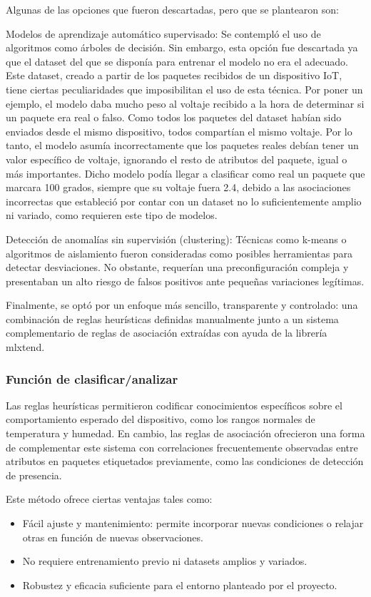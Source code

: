 Algunas de las opciones que fueron descartadas, pero que se plantearon son:

Modelos de aprendizaje automático supervisado: Se contempló el uso de algoritmos como árboles de decisión. Sin embargo, esta opción fue descartada ya que el dataset del que se disponía para entrenar el modelo no era el adecuado. Este dataset, creado a partir de los paquetes recibidos de un dispositivo IoT, tiene ciertas peculiaridades que imposibilitan el uso de esta técnica. Por poner un ejemplo, el modelo daba mucho peso al voltaje recibido a la hora de determinar si un paquete era real o falso. Como todos los paquetes del dataset habían sido enviados desde el mismo dispositivo, todos compartían el mismo voltaje. Por lo tanto, el modelo asumía incorrectamente que los paquetes reales debían tener un valor específico de voltaje, ignorando el resto de atributos del paquete, igual o más importantes. Dicho modelo podía llegar a clasificar como real un paquete que marcara 100 grados, siempre que su voltaje fuera 2.4, debido a las asociaciones incorrectas que estableció por contar con un dataset no lo suficientemente amplio ni variado, como requieren este tipo de modelos.

Detección de anomalías sin supervisión (clustering): Técnicas como k-means o algoritmos de aislamiento fueron consideradas como posibles herramientas para detectar desviaciones. No obstante, requerían una preconfiguración compleja y presentaban un alto riesgo de falsos positivos ante pequeñas variaciones legítimas.

Finalmente, se optó por un enfoque más sencillo, transparente y controlado: una combinación de reglas heurísticas definidas manualmente junto a un sistema complementario de reglas de asociación extraídas con ayuda de la librería mlxtend.

\subsubsection{Función de clasificar/analizar}

Las reglas heurísticas permitieron codificar conocimientos específicos sobre el comportamiento esperado del dispositivo, como los rangos normales de temperatura y humedad. En cambio, las reglas de asociación ofrecieron una forma de complementar este sistema con correlaciones frecuentemente observadas entre atributos en paquetes etiquetados previamente, como las condiciones de detección de presencia.

Este método ofrece ciertas ventajas tales como:
\begin{itemize}
    \item Fácil ajuste y mantenimiento: permite incorporar nuevas condiciones o relajar otras en función de nuevas observaciones.
    \item No requiere entrenamiento previo ni datasets amplios y variados.
    \item Robustez y eficacia suficiente para el entorno planteado por el proyecto.
\end{itemize}

